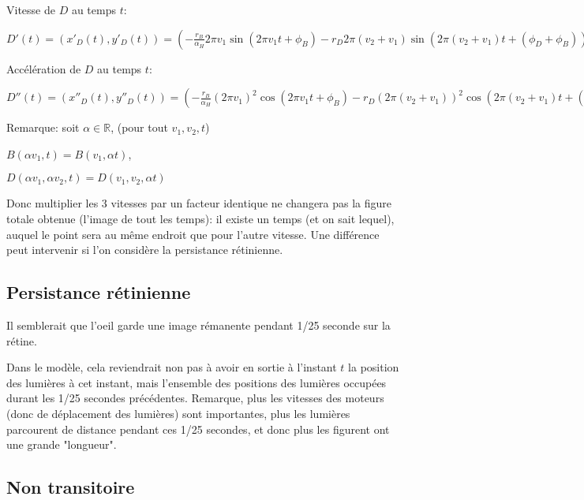 \documentclass[11pt,a4paper]{article}
\newcommand{\R}{\mathbb R}%
\begin{document}
Vitesse de $D$ au temps $t$:

$ D'(t) = (x'_D(t),y'_D(t)) = (-\frac{r_B}{\alpha_H} 2 \pi v_1 \sin(2 \pi v_1 t + \phi_B) - r_D 2 \pi (v_2 + v _1) \sin(2 \pi (v_2 + v _1)t + (\phi_D + \phi_B)), \frac{r_B}{\alpha_H} 2 \pi  v_1 \cos(2 \pi v_1 t + \phi_B ) + r_D  2 \pi (v_2 + v _1) \cos(2 \pi (v_2 +v_1)t +  (\phi_D + \phi_B))  )$



Accélération de $D$ au temps $t$:

$ D''(t) = (x''_D(t),y''_D(t)) = (-\frac{r_B}{\alpha_H} (2 \pi v_1)^2 \cos(2 \pi v_1 t + \phi_B) - r_D  (2 \pi (v_2 + v _1))^2 \cos(2 \pi (v_2 + v _1)t + (\phi_D + \phi_B)), - \frac{r_B}{\alpha_H} (2 \pi  v_1)^2 \sin(2 \pi v_1 t + \phi_B ) - r_D  (2 \pi (v_2 + v _1))^2 \sin(2 \pi (v_2 +v_1)t +  (\phi_D + \phi_B))  )$



Remarque: soit $\alpha \in \R$, (pour tout $v_1,v_2,t$)

$B(\alpha v_1,t) = B(v_1,\alpha t)$,

$D(\alpha v_1,\alpha v_2,t) = D(v_1,v_2,\alpha t)$

Donc multiplier les 3 vitesses par un facteur identique ne changera pas la figure totale obtenue (l'image de tout les temps): il existe un temps (et on sait lequel), auquel le point sera au même endroit que pour l'autre vitesse. Une différence peut intervenir si l'on considère la persistance rétinienne.




\subsection{Persistance rétinienne}

Il semblerait que l’oeil garde une image rémanente pendant 1/25 seconde sur la rétine.

Dans le modèle, cela reviendrait non pas à avoir en sortie à l'instant $t$ la position des lumières à cet instant, mais l'ensemble des positions des lumières occupées durant les 1/25 secondes précédentes. Remarque, plus les vitesses des moteurs (donc de déplacement des lumières) sont importantes, plus les lumières parcourent de distance pendant ces 1/25 secondes, et donc plus les figurent ont une grande "longueur".


\subsection{Non transitoire}
\end{document}
